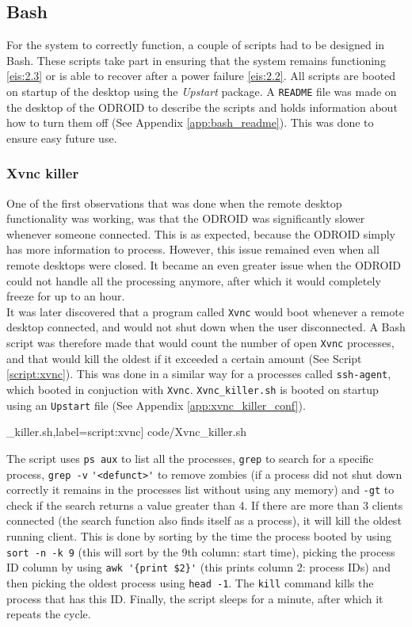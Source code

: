 \subsection{Bash}\label{sec:bash}
For the system to correctly function, a couple of scripts had to be designed in Bash. These scripts take part in ensuring that the system remains functioning \ref{eis:2.3} or is able to recover after a power failure \ref{eis:2.2}. All scripts are booted on startup of the desktop using the \textit{Upstart} \cite{upstart} package. A \verb|README| file was made on the desktop of the ODROID to describe the scripts and holds information about how to turn them off (See Appendix \ref{app:bash_readme}). This was done to ensure easy future use.

\subsubsection{Xvnc killer}
One of the first observations that was done when the remote desktop functionality was working, was that the ODROID was significantly slower whenever someone connected. This is as expected, because the ODROID simply has more information to process. However, this issue remained even when all remote desktops were closed. It became an even greater issue when the ODROID could not handle all the processing anymore, after which it would completely freeze for up to an hour.\\

It was later discovered that a program called \verb|Xvnc| would boot whenever a remote desktop connected, and would not shut down when the user disconnected. A Bash script was therefore made that would count the number of open \verb|Xvnc| processes, and that would kill the oldest if it exceeded a certain amount (See Script \ref{script:xvnc}). This was done in a similar way for a processes called \verb|ssh-agent|, which booted in conjuction with \verb|Xvnc|. \verb|Xvnc_killer.sh| is booted on startup using an \verb|Upstart| file (See Appendix \ref{app:xvnc_killer_conf}).

\scriptsize
	\_killer.sh,label=script:xvnc] {code/Xvnc_killer.sh}
\normalsize

The script uses \verb|ps aux| to list all the processes, \verb|grep| to search for a specific process, \verb|grep -v| \verb|'<defunct>'| to remove zombies (if a process did not shut down correctly it remains in the processes list without using any memory) and \verb|-gt| to check if the search returns a value greater than 4. If there are more than 3 clients connected (the search function also finds itself as a process), it will kill the oldest running client. This is done by sorting by the time the process booted by using \verb|sort -n -k 9| (this will sort by the 9th column: start time), picking the process ID column by using \verb|awk '{print $2}'| (this prints column 2: process IDs) and then picking the oldest process using \verb|head -1|. The \verb|kill| command kills the process that has this ID. Finally, the script sleeps for a minute, after which it repeats the cycle.


